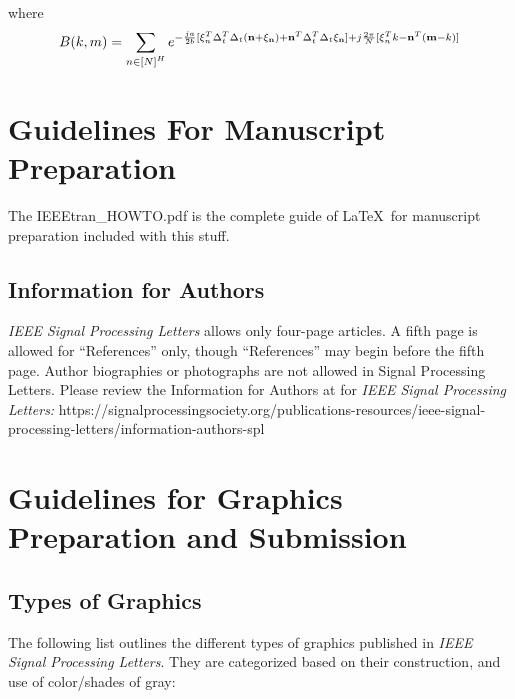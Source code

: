\documentclass[journal]{IEEEtran}
\begin{document}
where
\begin{align}
	B(k,m) = \sum\limits_{n \in {{[N]}^H}} {{e^{ - \frac{{ja}}{{2b}}[\xi _n^T\Delta _t^T{\Delta _t}({\bf{n}} + {\xi _{\bf{n}}}) + {{\bf{n}}^T}\Delta _t^T{\Delta _t}{\xi _{\bf{n}}}] + j\frac{{2\pi }}{N}[\xi _n^Tk - {{\bf{n}}^T}({\bf{m}} - k)]}}} 
\end{align}


















\section{Guidelines For Manuscript Preparation}

The IEEEtran\_HOWTO.pdf is the complete guide of \LaTeX\ for manuscript preparation included with this stuff. 

\subsection{Information for Authors}

{\em IEEE Signal Processing Letters} allows only four-page articles. A fifth page is allowed for ``References'' only, though ``References'' may begin before the fifth page. Author biographies or photographs are not allowed in Signal Processing Letters. Please review the Information for Authors at for {\em IEEE Signal Processing Letters:} https://signalprocessingsociety.org/publications-resources/ieee-signal-processing-letters/information-authors-spl %


\section{Guidelines for Graphics Preparation and Submission}
\label{sec:guidelines}

\subsection{Types of Graphics}
The following list outlines the different types of graphics published in 
{\it IEEE Signal Processing Letters}. They are categorized based on their construction, and use of 
color/shades of gray:
\end{document}
